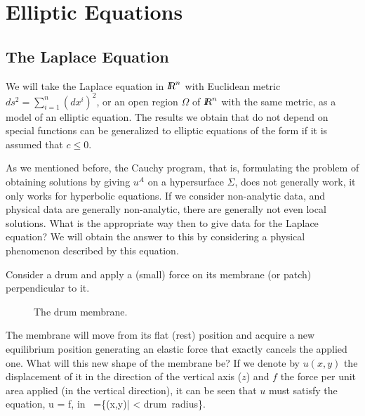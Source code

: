 

\chapter{Elliptic Equations}
\label{elliptic_equations}

\section{The Laplace Equation}

We will take the Laplace equation in $\mbox{\sl {l$\!\!\!\;\:\!$R}}^n$ with Euclidean metric $ds^2 = \sum^n_{i=1} (dx^i)^2$,
or an open region $\Omega$ of $\mbox{\sl {l$\!\!\!\;\:\!$R}}^n$ with the same metric, as a model of an elliptic equation.
The results we obtain that do not depend on special functions can be generalized to elliptic equations of the form  if it is assumed that $c \leq 0$.

As we mentioned before, the Cauchy program, that is, formulating the problem of obtaining solutions by giving $u^A$ on a hypersurface $\Sigma$, does not generally work, it only works for hyperbolic equations.
If we consider non-analytic data, and physical data are generally non-analytic, there are generally not even local solutions.
What is the appropriate way then to give data for the Laplace equation? We will obtain the answer to this by considering a physical phenomenon described by this equation.

Consider a drum and apply a (small) force on its membrane (or patch) perpendicular to it.

\espa 
\begin{figure}[htbp]
  \begin{center}
    \caption{The drum membrane.}
    \label{fig:12_1}
  \end{center}
\end{figure}

The membrane will move from its flat (rest) position and acquire a new equilibrium position generating an elastic force that exactly cancels the applied one.
What will this new shape of the membrane be?
If we denote by $u(x,y)$ the displacement of it in the direction of the vertical axis ($z$) and $f$ the force per unit area applied (in the vertical direction), it can be seen that $u$ must satisfy the equation,
\beq 
\Delta u = f, \mbox{in } \Omega=\{(x,y)|  < \mbox{drum radius}\}.
\label{ec2*}
\eeq


